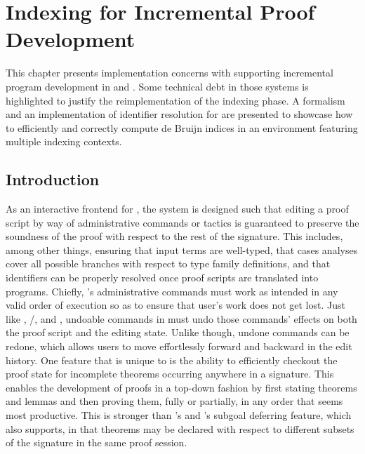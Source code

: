 \chapter{Indexing for Incremental Proof Development}\label{chapter:indexing-reimplementation}

This chapter presents implementation concerns with supporting incremental program development in \Beluga and \Harpoon.
Some technical debt in those systems is highlighted to justify the reimplementation of the indexing phase.
A formalism and an implementation of identifier resolution for \Beluga are presented to showcase how to efficiently and correctly compute de Bruijn indices in an environment featuring multiple indexing contexts.

\section{Introduction}


As an interactive frontend for \Beluga, the \Harpoon system is designed such that editing a proof script by way of administrative commands or tactics is guaranteed to preserve the soundness of the proof with respect to the rest of the \Beluga signature.
This includes, among other things, ensuring that input terms are well-typed, that cases analyses cover all possible branches with respect to type family definitions, and that identifiers can be properly resolved once proof scripts are translated into programs.
Chiefly, \Harpoon's administrative commands must work as intended in any valid order of execution so as to ensure that user's work does not get lost.
Just like \Abella, \Isabelle/\Isar, \Coq and \Agda, undoable commands in \Harpoon must undo those commands' effects on both the proof script and the editing state.
Unlike \Abella though, undone commands can be redone, which allows users to move effortlessly forward and backward in the edit history.
One feature that is unique to \Harpoon is the ability to efficiently checkout the proof state for incomplete theorems occurring anywhere in a \Beluga signature.
This enables the development of proofs in a top-down fashion by first stating theorems and lemmas and then proving them, fully or partially, in any order that seems most productive.
This is stronger than \Abella's and \Coq's subgoal deferring feature, which \Harpoon also supports, in that theorems may be declared with respect to different subsets of the signature in the same proof session.

